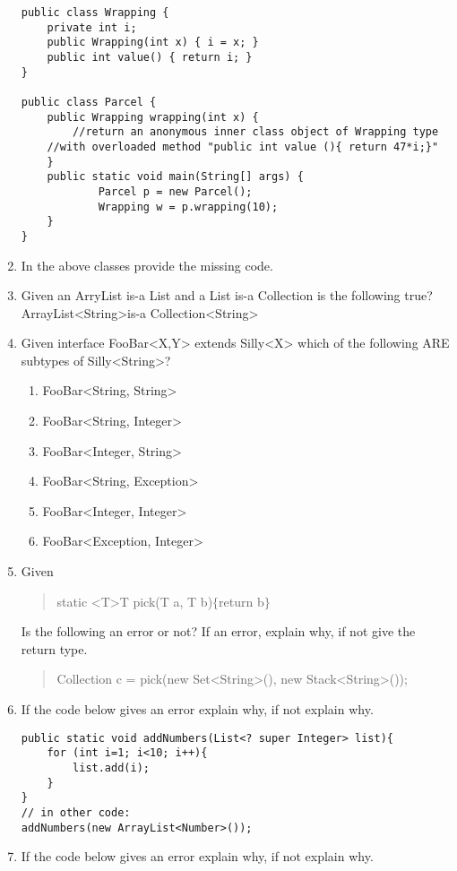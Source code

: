 \documentclass{article}
\begin{document}
\begin{enumerate}
\begin{lstlisting}
public class Wrapping {
  	private int i;
  	public Wrapping(int x) { i = x; }
  	public int value() { return i; }
}

public class Parcel {
  	public Wrapping wrapping(int x) {
    	//return an anonymous inner class object of Wrapping type
   	//with overloaded method "public int value (){ return 47*i;}"
  	}
  	public static void main(String[] args) {
    		Parcel p = new Parcel();
    		Wrapping w = p.wrapping(10);
  	}
}
\end{lstlisting}
	\item In the above classes provide the missing code.
	\item Given an ArryList is-a List and a List is-a Collection is the following true? ArrayList\textless String\textgreater is-a Collection\textless String\textgreater
	\item Given interface FooBar<X,Y> extends Silly<X> which of the following ARE subtypes of Silly<String>?
	\begin{enumerate}
		\item FooBar<String, String>
		\item FooBar<String, Integer>
		\item FooBar<Integer, String>
		\item FooBar<String, Exception>
		\item FooBar<Integer, Integer>
		\item FooBar<Exception, Integer>
	\end{enumerate}
	\item Given
	\begin{quote}
		static \textless T\textgreater  T pick(T a, T b)$\{$return b$\}$
	\end{quote}
	Is the following an error or not? If an error, explain why, if not give the return type.
	\begin{quote}
		Collection c = pick(new Set\textless String\textgreater (), new Stack\textless String\textgreater());
	\end{quote}
	\newpage
	\item If the code below gives an error explain why, if not explain why.
\begin{lstlisting}
public static void addNumbers(List<? super Integer> list){
	for (int i=1; i<10; i++){
		list.add(i);
	}
}
// in other code:
addNumbers(new ArrayList<Number>());
\end{lstlisting}
	\item If the code below gives an error explain why, if not explain why.\newline

\end{enumerate}
\end{document}
